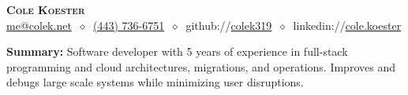 \documentclass[letterpaper,11pt]{article}
\begin{document}
\begin{center}
\textbf{\LARGE\scshape Cole Koester} \\
\vspace{1pt}\small
\href{mailto:me@colek.net}{me@colek.net}
$\ \diamond\ $
\href{tel:+14437366751}{(443) 736-6751}
$\ \diamond\ $
github://\href{https://github.com/colek319}{colek319}
$\ \diamond\ $
linkedin://\href{https://www.linkedin.com/cole.koester}{cole.koester}
\end{center}

\noindent\begin{minipage}{\textwidth}
\footnotesize
\textbf{Summary:} Software developer with 5 years of experience in full-stack programming and cloud architectures, migrations, and operations. Improves and debugs large scale systems while minimizing user disruptions.
\end{minipage}
\end{document}
